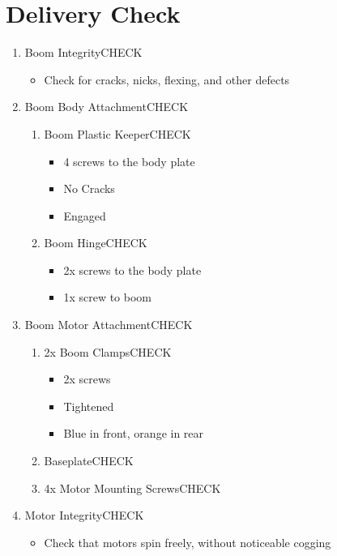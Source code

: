 \documentclass{report}
\begin{document}
	\section{Delivery Check}
		\begin{enumerate}
			\item Boom Integrity\hrulefill CHECK
				\begin{itemize}
					\item Check for cracks, nicks, flexing, and other defects
				\end{itemize}
			\item Boom Body Attachment\hrulefill CHECK
				\begin{enumerate}
					\item Boom Plastic Keeper\hrulefill CHECK
						\begin{itemize}
							\item 4 screws to the body plate
							\item No Cracks
							\item Engaged
						\end{itemize}
					\item Boom Hinge\hrulefill CHECK
						\begin{itemize}
							\item 2x screws to the body plate
							\item 1x screw to boom
						\end{itemize}
				\end{enumerate}
			\item Boom Motor Attachment\hrulefill CHECK
				\begin{enumerate}
					\item 2x Boom Clamps\hrulefill CHECK
						\begin{itemize}
							\item 2x screws
							\item Tightened
							\item Blue in front, orange in rear
						\end{itemize}
					\item Baseplate\hrulefill CHECK
					\item 4x Motor Mounting Screws\hrulefill CHECK
				\end{enumerate}
			\item Motor Integrity\hrulefill CHECK
				\begin{itemize}
					\item Check that motors spin freely, without noticeable cogging
				\end{itemize}

\end{enumerate}
\end{document}
